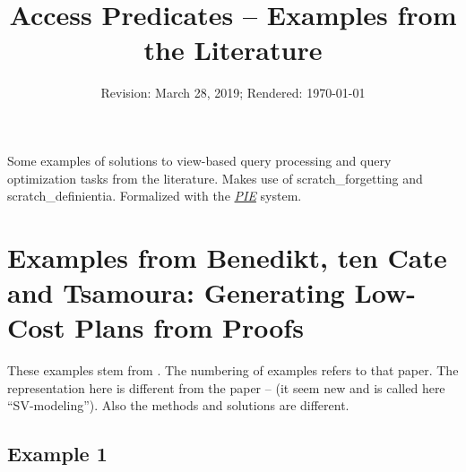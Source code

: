 \documentclass[a4paper]{article}
\newcounter{def}
\begin{document}
%
%
\title{Access Predicates -- Examples from the Literature}
\date{Revision: March 28, 2019; Rendered: \today}
\maketitle

\noindent Some examples of solutions to view-based query processing and query
optimization tasks from the literature. Makes use of scratch\_forgetting and
scratch\_definientia. Formalized with the
\href{http://cs.christophwernhard.com/pie/}{\textit{PIE}} system.

\tableofcontents
%
%
\section{Examples from Benedikt, ten Cate and Tsamoura: Generating Low-Cost
Plans from Proofs}

These examples stem from \cite{benedikt:etal:2014:generating}.  The numbering
of examples refers to that paper.  The representation here is different from
the paper -- (it seem new and is called here ``SV-modeling''). Also the
methods and solutions are different.
%
%
\subsection{Example 1}
\end{document}
